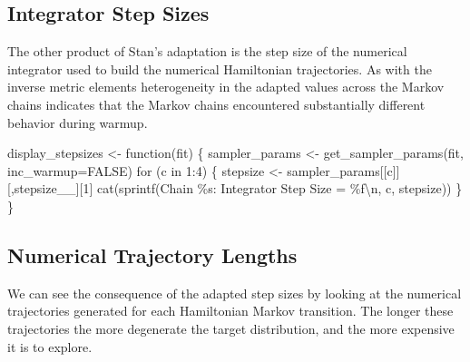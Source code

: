 \documentclass[
  letterpaper,
  DIV=11,
  numbers=noendperiod]{scrartcl}
\newenvironment{Shaded}{\begin{snugshade}}{\end{snugshade}}
\newcommand{\AttributeTok}[1]{\textcolor[rgb]{0.40,0.45,0.13}{#1}}
\newcommand{\ConstantTok}[1]{\textcolor[rgb]{0.56,0.35,0.01}{#1}}
\newcommand{\ControlFlowTok}[1]{\textcolor[rgb]{0.00,0.23,0.31}{#1}}
\newcommand{\DecValTok}[1]{\textcolor[rgb]{0.68,0.00,0.00}{#1}}
\newcommand{\FunctionTok}[1]{\textcolor[rgb]{0.28,0.35,0.67}{#1}}
\newcommand{\NormalTok}[1]{\textcolor[rgb]{0.00,0.23,0.31}{#1}}
\newcommand{\OtherTok}[1]{\textcolor[rgb]{0.00,0.23,0.31}{#1}}
\newcommand{\SpecialCharTok}[1]{\textcolor[rgb]{0.37,0.37,0.37}{#1}}
\newcommand{\StringTok}[1]{\textcolor[rgb]{0.13,0.47,0.30}{#1}}
\begin{document}
\hypertarget{integrator-step-sizes}{%
\subsection{Integrator Step Sizes}\label{integrator-step-sizes}}

The other product of Stan's adaptation is the step size of the numerical
integrator used to build the numerical Hamiltonian trajectories. As with
the inverse metric elements heterogeneity in the adapted values across
the Markov chains indicates that the Markov chains encountered
substantially different behavior during warmup.

\begin{Shaded}
\begin{Highlighting}[]
\NormalTok{display\_stepsizes }\OtherTok{\textless{}{-}} \ControlFlowTok{function}\NormalTok{(fit) \{}
\NormalTok{  sampler\_params }\OtherTok{\textless{}{-}} \FunctionTok{get\_sampler\_params}\NormalTok{(fit, }\AttributeTok{inc\_warmup=}\ConstantTok{FALSE}\NormalTok{)}
  \ControlFlowTok{for}\NormalTok{ (c }\ControlFlowTok{in} \DecValTok{1}\SpecialCharTok{:}\DecValTok{4}\NormalTok{) \{}
\NormalTok{    stepsize }\OtherTok{\textless{}{-}}\NormalTok{ sampler\_params[[c]][,}\StringTok{\textquotesingle{}stepsize\_\_\textquotesingle{}}\NormalTok{][}\DecValTok{1}\NormalTok{]}
    \FunctionTok{cat}\NormalTok{(}\FunctionTok{sprintf}\NormalTok{(}\StringTok{\textquotesingle{}Chain \%s: Integrator Step Size = \%f}\SpecialCharTok{\textbackslash{}n}\StringTok{\textquotesingle{}}\NormalTok{,}
\NormalTok{                c, stepsize))}
\NormalTok{  \}}
\NormalTok{\}}
\end{Highlighting}
\end{Shaded}

\hypertarget{numerical-trajectory-lengths}{%
\subsection{Numerical Trajectory
Lengths}\label{numerical-trajectory-lengths}}

We can see the consequence of the adapted step sizes by looking at the
numerical trajectories generated for each Hamiltonian Markov transition.
The longer these trajectories the more degenerate the target
distribution, and the more expensive it is to explore.
\end{document}
